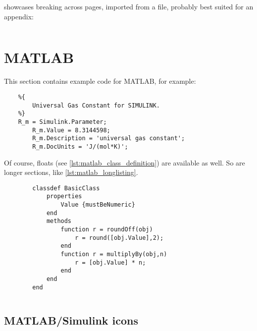  showcases breaking across pages, imported from a file, probably best suited for an appendix:

\begin{longlisting}
    \caption{%
        This is a page breaking code, with a caption, which is imported from a file!%
    }
    \label{lst:longlisting_example}
    \inputminted{python}{assets/code/ansi_escaped_string.py}
\end{longlisting}

\section{MATLAB}

This section contains example code for MATLAB, for example:
\begin{verbatim}
    %{
        Universal Gas Constant for SIMULINK.
    %}
    R_m = Simulink.Parameter;
        R_m.Value = 8.3144598;
        R_m.Description = 'universal gas constant';
        R_m.DocUnits = 'J/(mol*K)';
\end{verbatim}
Of course, floats (see \cref{lst:matlab_class_definition}) are available as well.
So are longer sections, like \cref{lst:matlab_longlisting}.

\begin{listing}
    \caption[A class definition in MATLAB]{%
        A class definition in MATLAB, from \cite{mathworksCreateSimpleClass2020}%
    }
    \label{lst:matlab_class_definition}
    \begin{verbatim}
        classdef BasicClass
            properties
                Value {mustBeNumeric}
            end
            methods
                function r = roundOff(obj)
                    r = round([obj.Value],2);
                end
                function r = multiplyBy(obj,n)
                    r = [obj.Value] * n;
                end
            end
        end
    \end{verbatim}
\end{listing}

\begin{longlisting}
    \caption{%
        This is a page breaking matlab code, with a caption, which is imported from a file!%
    }
    \label{lst:matlab_longlisting}
    \inputminted{python}{assets/code/matlab_long.m}
\end{longlisting}

\subsection{MATLAB/Simulink icons}


